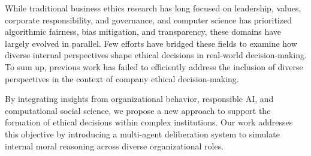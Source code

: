 While traditional business ethics research has long focused on leadership, values, corporate responsibility, and governance, and computer science has prioritized algorithmic fairness, bias mitigation, and transparency, these domains have largely evolved in parallel. Few efforts have bridged these fields to examine how diverse internal perspectives shape ethical decisions in real-world decision-making.
To sum up, previous work has failed to efficiently address the inclusion of diverse perspectives in the context of company ethical decision-making.

By integrating insights from organizational behavior, responsible AI, and computational social science, we propose a new approach to support the formation of ethical decisions within complex institutions. Our work addresses this objective by introducing a multi-agent deliberation system to simulate internal moral reasoning across diverse organizational roles.
